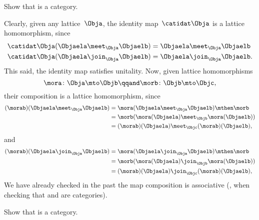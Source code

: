 \begin{exercise}
    \label{ex:lat_is_cat}
    Show that \Lat is a category.
\end{exercise}
\begin{solution}
    Clearly, given any lattice~$\Obja$, the identity map~$\catidat\Obja$ is a lattice homomorphism, since
    \begin{equation}
        \begin{aligned}
            \catidat\Obja(\Objaela \meet_\Obja \Objaelb) & =\Objaela \meet_\Obja \Objaelb \\
            \catidat\Obja(\Objaela \join_\Obja \Objaelb) & =\Objaela \join_\Obja \Objaelb.
        \end{aligned}
    \end{equation}
    This said, the identity map satisfies unitality.
    Now, given lattice homomorphisms
    \begin{equation}
        \mora\colon \Obja \mto \Objb
        \qqand
        \morb\colon \Objb\mto \Objc,
    \end{equation}
    their composition is a lattice homomorphism, since
    \begin{equation}
        \begin{aligned}
            (\morab)(\Objaela \meet_\Obja \Objaelb)
             & = \mora(\Objaela \meet_\Obja \Objaelb) \mthen \morb \\
             & = \morb(\mora(\Objaela) \meet_\Objb \mora(\Objaelb)) \\
             & =(\morab)(\Objaela) \meet_\Objc (\morab)(\Objaelb),
        \end{aligned}
    \end{equation}
    and
    \begin{equation}
        \begin{aligned}
            (\morab)(\Objaela \join_\Obja \Objaelb)
             & = \mora(\Objaela \join_\Obja \Objaelb) \mthen \morb \\
             & = \morb(\mora(\Objaela) \join_\Objb \mora(\Objaelb)) \\
             & =(\morab)(\Objaela) \join_\Objc (\morab)(\Objaelb),
        \end{aligned}
    \end{equation}
    We have already checked in the past the map composition is associative (\eg, when checking that \Set and \Pos are categories).
\end{solution}

\begin{exercise}
    \label{ex:boundlat_is_cat}
    Show that \BoundedLat is a category.
\end{exercise}

